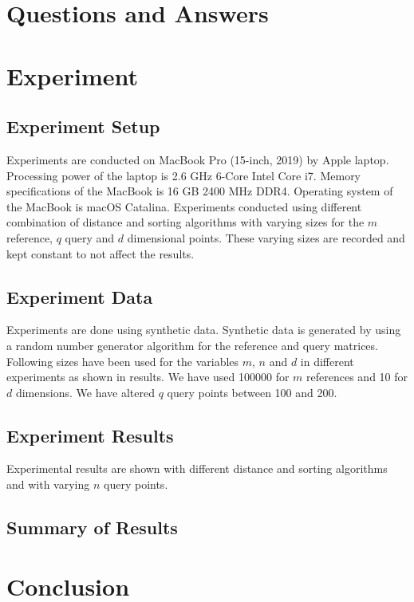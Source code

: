 \section{Questions and Answers}



\section{Experiment} 
\subsection{Experiment Setup}
Experiments are conducted on MacBook Pro (15-inch, 2019) by Apple laptop. Processing power of the laptop is 2.6 GHz 6-Core Intel Core i7. Memory specifications of the MacBook is 16 GB 2400 MHz DDR4. Operating system of the MacBook is macOS Catalina. Experiments conducted using different combination of distance and sorting algorithms with varying sizes for the $m$ reference, $q$ query and $d$ dimensional points. These varying sizes are recorded and kept constant to not affect the results.

\subsection{Experiment Data}
Experiments are done using synthetic data. Synthetic data is generated by using a random number generator algorithm for the reference and query matrices. Following sizes have been used for the variables $m$, $n$ and $d$ in different experiments as shown in results. We have used 100000 for $m$ references and 10 for $d$ dimensions. We have altered $q$ query points between 100 and 200.
\subsection{Experiment Results}
Experimental results are shown with different distance and sorting algorithms and with varying $n$ query points.


\subsection{Summary of Results}


\section{Conclusion} 


\newpage



 

